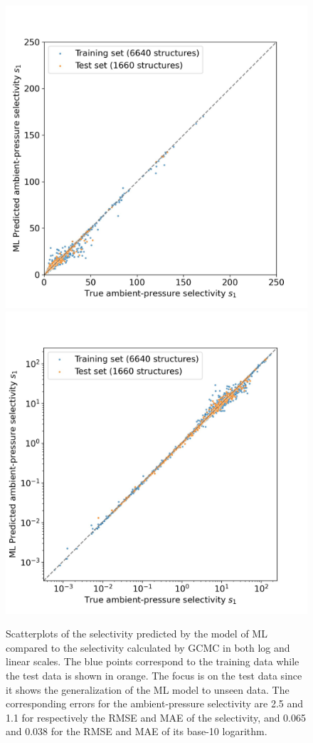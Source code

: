 \documentclass[main]{subfiles}
\begin{document}
\begin{figure}[ht]
  \centering
    \includegraphics[width=0.48\linewidth]{figures/4-ml/SI_figure/Scatterplot_S1_prediction.jpeg}
    \hfill
    \includegraphics[width=0.48\linewidth]{figures/4-ml/SI_figure/Scatterplot_S1_prediction_logscale.jpeg}
    \caption{Scatterplots of the selectivity predicted by the model of ML compared to the selectivity calculated by GCMC in both log and linear scales. The blue points correspond to the training data while the test data is shown in orange. The focus is on the test data since it shows the generalization of the ML model to unseen data. The corresponding errors for the ambient-pressure selectivity are 2.5 and 1.1 for respectively the RMSE and MAE of the selectivity, and 0.065 and 0.038 for the RMSE and MAE of its base-10 logarithm. }\label{fgr:S1_prediction}
  \end{figure}
\end{document}
